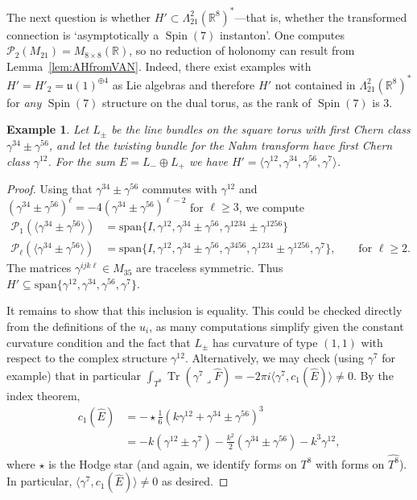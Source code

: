 \documentclass{article}
\newcommand{\wh}{\widehat}
\newcommand{\real}{\mathbb{R}}
\newcommand{\vspan}{\mathrm{span}}
\DeclareMathOperator\Spin{Spin}
\DeclareMathOperator{\Tr}{Tr}
\newtheorem{example}[theorem]{Example}
\theoremstyle{definition}
\theoremstyle{remark}
\begin{document}
The next question is whether $H' \subset \Lambda^2_{21} (\real^8)^*$---that is, whether the transformed connection is `asymptotically a $\Spin(7)$ instanton'.
One computes $\mathcal{P}_2(M_{21}) = M_{8 \times 8}(\real)$, so no reduction of holonomy can result from Lemma~\ref{lem:AHfromVAN}.
Indeed, there exist examples with $H' = H'_{2} = \mathfrak{u}(1)^{\oplus 4}$ as Lie algebras and therefore $H'$ not contained in $\Lambda^2_{21} (\real^8)^*$ for \emph{any} $\Spin(7)$ structure on the dual torus, as the rank of $\Spin(7)$ is 3.
\begin{example}
    \label{ex:3456}
    Let $L_{\pm}$ be the line bundles on the square torus with first Chern class $\gamma^{34} \pm \gamma^{56}$, and let the twisting bundle for the Nahm transform have first Chern class $\gamma^{12}$.
    For the sum $E = L_- \oplus L_+$ we have $H' = \langle \gamma^{12}, \gamma^{34}, \gamma^{56}, \gamma^7 \rangle$.
\end{example}
\begin{proof}
    Using that $\gamma^{34} \pm \gamma^{56}$ commutes with $\gamma^{12}$ and $(\gamma^{34} \pm \gamma^{56})^\ell = -4(\gamma^{34} \pm \gamma^{56})^{\ell-2}$ for $\ell \ge 3$, we compute
    \begin{align*}
        \mathcal{P}_1(\langle \gamma^{34} \pm \gamma^{56}\rangle) &= \vspan\{I, \gamma^{12}, \gamma^{34} \pm \gamma^{56}, \gamma^{1234} \pm \gamma^{1256}\} \\
        \mathcal{P}_\ell(\langle\gamma^{34} \pm \gamma^{56}\rangle) &= \vspan\{I, \gamma^{12}, \gamma^{34} \pm \gamma^{56}, \gamma^{3456}, \gamma^{1234} \pm \gamma^{1256}, \gamma^{7}\}, \qquad\text{for }\ell \ge 2.
    \end{align*}
    The matrices $\gamma^{ijk\ell} \in M_{35}$ are traceless symmetric.
    Thus $H' \subseteq \vspan \{ \gamma^{12}, \gamma^{34}, \gamma^{56}, \gamma^7 \}$.

    It remains to show that this inclusion is equality.
    This could be checked directly from the definitions of the $u_i$, as many computations simplify given the constant curvature condition and the fact that $L_{\pm}$ has curvature of type $(1,1)$ with respect to the complex structure $\gamma^{12}$.
    Alternatively, we may check (using $\gamma^7$ for example) that in particular $\int_{T^8} \Tr(\gamma^7 \lrcorner \wh{F}) = -2\pi i\langle \gamma^{7}, c_1(\wh{E})\rangle \neq 0$.
    By the index theorem,
    \begin{align*}
        c_1(\wh{E}) &= -\star \frac{1}{6} (k\gamma^{12} + \gamma^{34} \pm \gamma^{56})^3 \\
                    &= - k  (\gamma^{12} \pm \gamma^7) - \frac{k^2}{2} (\gamma^{34} \pm \gamma^{56}) - k^3 \gamma^{12},
    \end{align*}
    where $\star$ is the Hodge star (and again, we identify forms on $T^8$ with forms on $\wh{T^8}$).
    In particular, $\langle \gamma^7, c_1(\wh{E}) \rangle \neq 0$ as desired.
\end{proof}
\printbibliography
\end{document}

